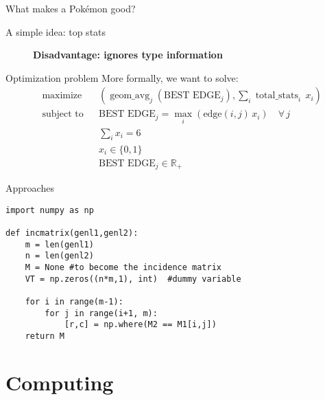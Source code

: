 \documentclass[12pt, aspectratio=149]{beamer}
\theoremstyle{plain}
\begin{document}
\begin{frame}[fragile]{What makes a Pokémon good?}
\begin{figure}
	\centering
	\label{fig:bulbasaur}
\end{figure}
\end{frame}


\begin{frame}[fragile]{A simple idea: top stats}
\begin{figure}
	\centering
	\begin{center}
		\textbf{Disadvantage: ignores type information}
	\end{center}
\end{figure}
\end{frame}

\begin{frame}[fragile]{Optimization problem}
	More formally, we want to solve:
	\\
	\begin{align*}
	& \text{maximize}   && 
	\left(
	\operatorname{geom\_avg}_j \left( \text{BEST EDGE}_j \right) ,
	\sum_i \operatorname{total\_stats}_i \, x_i
	\right)
	\\
	& \text{subject to} && \text{BEST EDGE}_j= \max_i \left( \text{edge}(i, j) \, x_i \right) \quad \forall \, j \\
	& && \sum_i x_i = 6    \\
	& && x_{i} \in \{0, 1\}   \\
& && 	\text{BEST EDGE}_j \in \mathbb{R}_+  
	\end{align*}
\end{frame}


\begin{frame}[fragile]{Approaches}
	
\begin{verbatim}
import numpy as np
    
def incmatrix(genl1,genl2):
    m = len(genl1)
    n = len(genl2)
    M = None #to become the incidence matrix
    VT = np.zeros((n*m,1), int)  #dummy variable

    for i in range(m-1):
        for j in range(i+1, m):
            [r,c] = np.where(M2 == M1[i,j])
    return M
\end{verbatim}
\end{frame}


\section{Computing}
\end{document}
